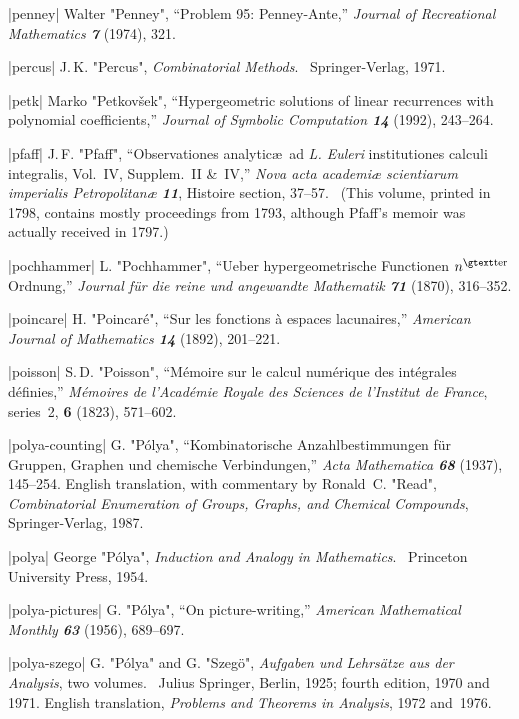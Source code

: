 \bib|penney|%
Walter "Penney", ``Problem 95: Penney-Ante,''
{\sl Journal of Recreational Mathematics\/ \bf7} (1974), 321.

\bib|percus|%
J.\,K. "Percus", {\sl Combinatorial Methods}. \ Springer-Verlag, 1971.

\bib|petk|%
Marko "Petkov\v{s}ek", ``Hypergeometric solutions of linear recurrences
with polynomial coefficients,'' {\sl Journal of Symbolic Computation\/ \bf14}
(1992), 243--264.

\bib|pfaff|%
J.\,F. "Pfaff", ``Observationes analytic\ae\ ad {\it L. Euleri\/} institutiones
calculi integralis, Vol.~IV, Supplem.~II \&~IV,''
{\sl Nova acta academi{\ae} scientiarum imperialis Petropolitan{\ae}\/ \bf11},
Histoire section, 37--57. \ (This volume, printed in 1798, contains
mostly proceedings from 1793, although Pfaff's memoir was actually
received in 1797.)

\bib|pochhammer|%
L. "Pochhammer", ``Ueber hypergeometrische Functionen $n^{\rm ter}$
Ordnung,'' 
{\sl Journal f\"ur die reine und angewandte Mathematik\/ \bf71} (1870),
316--352.

\bib|poincare|%
H. "Poincar\'e", ``Sur les fonctions \`a espaces lacunaires,''
{\sl American Journal of Mathematics\/ \bf14} (1892), 201--221.

\bib|poisson|%
S.\,D. "Poisson", ``M\'emoire sur le calcul num\'erique des int\'egrales
d\'efinies,'' {\sl M\'emoires de l'Acad\'emie Royale des Sciences de
l'Institut de France}, series~2, {\bf6} (1823), 571--602.

\bib|polya-counting|%
G. "P\'olya", \kern-2.51pt``Kombinatorische Anzahlbestimmungen f\"ur Gruppen,
Graphen und chemische Verbindungen,'' {\sl Acta Mathematica\/ \bf68}
(1937), 145--254. English translation, with commentary by Ronald~C. "Read",
{\sl Combinatorial Enumeration of Groups, Graphs, and Chemical Compounds},
Springer-Verlag, 1987.

\bib|polya|%
George "P\'olya", {\sl Induction and Analogy in Mathematics}. \
Princeton University Press, 1954.

\bib|polya-pictures|%
G. "P\'olya", ``On picture-writing,''
{\sl American Mathematical Monthly\/ \bf63} (1956), 689--697.

\bib|polya-szego|%
G. "P\'olya" and G. "Szeg\"o", %
 {\sl Aufgaben und Lehrs\"atze
aus der Analy\-sis}, two volumes. \ Julius Springer, Berlin, 1925;
fourth edition, 1970 and 1971.
English translation, {\sl Problems and Theorems in Analysis}, 1972 and~1976.

